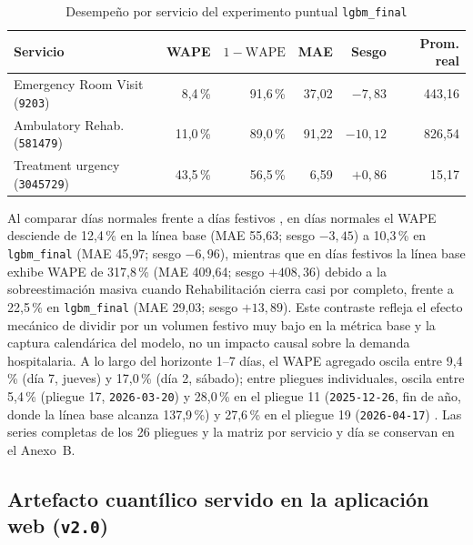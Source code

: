 \begin{table}[htbp]
\caption{Desempeño por servicio del experimento puntual \texttt{lgbm\_final}}
\label{tab:servicios_poisson}
{\singlespacing\small
\begin{tabularx}{\textwidth}{@{}Y r r r r r@{}}
\toprule
Servicio & WAPE & $1-\text{WAPE}$ & MAE & Sesgo & Prom. real \\
\midrule
Emergency Room Visit (\texttt{9203}) & 8,4\,\% & 91,6\,\% & 37,02 & $-7{,}83$ & 443,16 \\
Ambulatory Rehab. (\texttt{581479}) & 11,0\,\% & 89,0\,\% & 91,22 & $-10{,}12$ & 826,54 \\
Treatment urgency (\texttt{3045729}) & 43,5\,\% & 56,5\,\% & 6,59 & $+0{,}86$ & 15,17 \\
\bottomrule
\end{tabularx}}
\end{table}

Al comparar días normales frente a días festivos \parencite{mediflow2026demanda}, en días normales el WAPE desciende de 12,4\,\% en la línea base (MAE 55,63; sesgo $-3{,}45$) a 10,3\,\% en \texttt{lgbm\_final} (MAE 45,97; sesgo $-6{,}96$), mientras que en días festivos la línea base exhibe WAPE de 317,8\,\% (MAE 409,64; sesgo $+408{,}36$) debido a la sobreestimación masiva cuando Rehabilitación cierra casi por completo, frente a 22,5\,\% en \texttt{lgbm\_final} (MAE 29,03; sesgo $+13{,}89$). Este contraste refleja el efecto mecánico de dividir por un volumen festivo muy bajo en la métrica base y la captura calendárica del modelo, no un impacto causal sobre la demanda hospitalaria. A lo largo del horizonte 1--7 días, el WAPE agregado oscila entre 9,4\,\% (día 7, jueves) y 17,0\,\% (día 2, sábado); entre pliegues individuales, oscila entre 5,4\,\% (pliegue 17, \texttt{2026-03-20}) y 28,0\,\% en el pliegue 11 (\texttt{2025-12-26}, fin de año, donde la línea base alcanza 137,9\,\%) y 27,6\,\% en el pliegue 19 (\texttt{2026-04-17}) \parencite{mediflow2026demanda}. Las series completas de los 26 pliegues y la matriz por servicio y día se conservan en el Anexo~B.

\subsection{Artefacto cuantílico servido en la aplicación web (\texttt{v2.0})}

